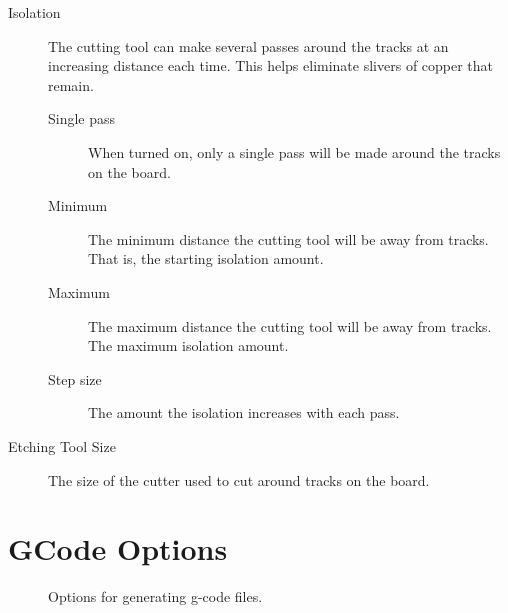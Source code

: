 \documentclass[11pt]{book}
\begin{document}
\begin{description}
\begin{description}
		\item[Isolation] The cutting tool can make several passes around the tracks at an increasing distance each time. This helps eliminate slivers of copper that remain.
		\begin{description}
			\item[Single pass] When turned on, only a single pass will be made around the tracks on the board.
			\item[Minimum] The minimum distance the cutting tool will be away from tracks. That is, the starting isolation amount.
			\item[Maximum] The maximum distance the cutting tool will be away from tracks. The maximum isolation amount.
			\item[Step size] The amount the isolation increases with each pass.
		\end{description}
		\item[Etching Tool Size] The size of the cutter used to cut around tracks on the board.
	\end{description}
\end{description}

%
%
\section{GCode Options}\label{sec:GCodeOptions}

\begin{figure}
	\caption{Options for generating g-code files.}
	\label{fig:GCodeOptions}
\end{figure}
\end{document}
